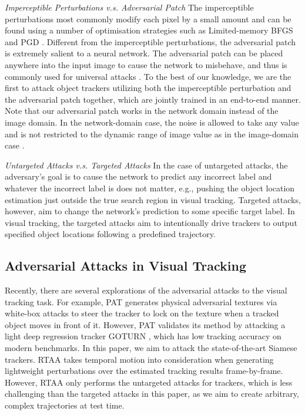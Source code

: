 \documentclass[journal]{IEEEtran}
\newcommand{\eg}{e.g.}
\begin{document}
\textit{Imperceptible Perturbations v.s. Adversarial Patch} The imperceptible perturbations most commonly modify each pixel by a small amount and can be found using a number of optimisation strategies such as Limited-memory BFGS \cite{intriguing} and PGD \cite{PGD}.
Different from the imperceptible perturbations, the adversarial patch is extremely salient to a neural network. The adversarial patch can be placed anywhere into the input image to cause the network to misbehave, and thus is commonly used for universal attacks \cite{patch}.
To the best of our knowledge, we are the first to attack object trackers utilizing both the imperceptible perturbation and the adversarial patch together, which are jointly trained in an end-to-end manner.
Note that our adversarial patch works in the network domain instead of the image domain. In the network-domain case, the noise is allowed to take any value and is not restricted to the dynamic range of image value as in the image-domain case \cite{karmon2018lavan}.

\textit{Untargeted Attacks v.s. Targeted Attacks} In the case of untargeted attacks, the adversary's goal is to cause the network to predict any incorrect label and whatever the incorrect label is does not matter, \eg, pushing the object location estimation just outside the true search region in visual tracking.
Targeted attacks, however, aim to change the network's prediction to some specific target label. In visual tracking, the targeted attacks aim to intentionally drive trackers to output specified object locations following a predefined trajectory.

\subsection{Adversarial Attacks in Visual Tracking}

Recently, there are several explorations of the adversarial attacks to the visual tracking task. For example, PAT \cite{PAT} generates physical adversarial textures via white-box attacks to steer the tracker to lock on the texture when a tracked object moves in front of it. However, PAT validates its method by attacking a light deep regression tracker GOTURN \cite{GOTURN}, which has low tracking accuracy on modern benchmarks. In this paper, we aim to attack the state-of-the-art Siamese trackers.
RTAA \cite{RTAA} takes temporal motion into consideration when generating lightweight perturbations over the estimated tracking results frame-by-frame. However, RTAA only performs the untargeted attacks for trackers, which is less challenging than the targeted attacks in this paper, as we aim to create arbitrary, complex trajectories at test time. 
\end{document}
